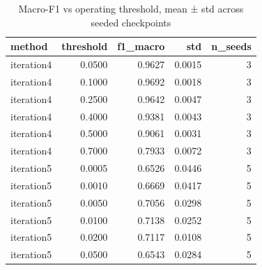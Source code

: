 \begin{table}
\caption{Macro-F1 vs operating threshold, mean ± std across seeded checkpoints}
\begin{tabular}{lrrrr}
\toprule
method & threshold & f1\_macro & std & n\_seeds \\
\midrule
iteration4 & 0.0500 & 0.9627 & 0.0015 & 3 \\
iteration4 & 0.1000 & 0.9692 & 0.0018 & 3 \\
iteration4 & 0.2500 & 0.9642 & 0.0047 & 3 \\
iteration4 & 0.4000 & 0.9381 & 0.0043 & 3 \\
iteration4 & 0.5000 & 0.9061 & 0.0031 & 3 \\
iteration4 & 0.7000 & 0.7933 & 0.0072 & 3 \\
iteration5 & 0.0005 & 0.6526 & 0.0446 & 5 \\
iteration5 & 0.0010 & 0.6669 & 0.0417 & 5 \\
iteration5 & 0.0050 & 0.7056 & 0.0298 & 5 \\
iteration5 & 0.0100 & 0.7138 & 0.0252 & 5 \\
iteration5 & 0.0200 & 0.7117 & 0.0108 & 5 \\
iteration5 & 0.0500 & 0.6543 & 0.0284 & 5 \\
\bottomrule
\end{tabular}
\end{table}
